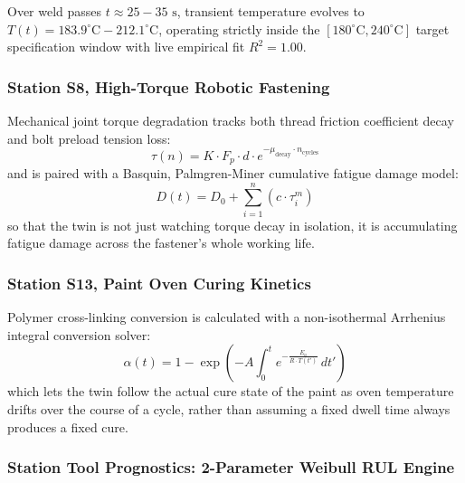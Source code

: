 \documentclass[11pt]{article}
\begin{document}
Over weld passes $t \approx 25 - 35\text{ s}$, transient temperature evolves to $T(t) = 183.9^\circ\text{C} - 212.1^\circ\text{C}$, operating strictly inside the $[180^\circ\text{C}, 240^\circ\text{C}]$ target specification window with live empirical fit $R^2 = 1.00$.

\subsubsection{Station S8, High-Torque Robotic Fastening}

Mechanical joint torque degradation tracks both thread friction coefficient decay and bolt preload tension loss:
\begin{equation}
\tau(n) = K \cdot F_p \cdot d \cdot e^{-\mu_{\text{decay}} \cdot n_{\text{cycles}}}
\end{equation}
and is paired with a Basquin, Palmgren-Miner cumulative fatigue damage model:
\begin{equation}
D(t) = D_0 + \sum_{i=1}^{n} \left(c \cdot \tau_i^{m}\right)
\end{equation}
so that the twin is not just watching torque decay in isolation, it is accumulating fatigue damage across the fastener's whole working life.

\subsubsection{Station S13, Paint Oven Curing Kinetics}

Polymer cross-linking conversion is calculated with a non-isothermal Arrhenius integral conversion solver:
\begin{equation}
\alpha(t) = 1 - \exp\left(-A \int_0^t e^{-\frac{E_a}{R \cdot T(t')}}\, dt'\right)
\end{equation}
which lets the twin follow the actual cure state of the paint as oven temperature drifts over the course of a cycle, rather than assuming a fixed dwell time always produces a fixed cure.

\subsubsection{Station Tool Prognostics: 2-Parameter Weibull RUL Engine}
\end{document}
